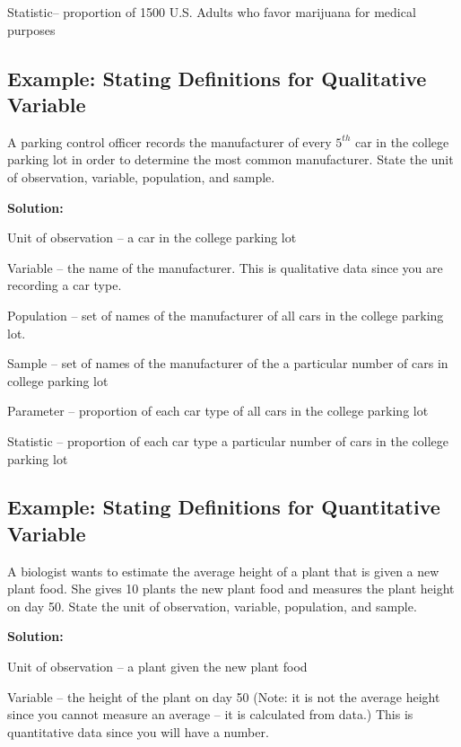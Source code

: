 \documentclass[
]{book}
\begin{document}
Statistic-- proportion of 1500 U.S. Adults who favor marijuana for medical purposes

\hypertarget{example-stating-definitions-for-qualitative-variable-1}{%
\subsection{Example: Stating Definitions for Qualitative Variable}\label{example-stating-definitions-for-qualitative-variable-1}}

A parking control officer records the manufacturer of every \(5^{th}\) car in the college parking lot in order to determine the most common manufacturer. State the unit of observation, variable, population, and sample.

\textbf{Solution:}

Unit of observation -- a car in the college parking lot

Variable -- the name of the manufacturer. This is qualitative data since you are recording a car type.

Population -- set of names of the manufacturer of all cars in the college parking lot.

Sample -- set of names of the manufacturer of the a particular number of cars in college parking lot

Parameter -- proportion of each car type of all cars in the college parking lot

Statistic -- proportion of each car type a particular number of cars in the college parking lot

\hypertarget{example-stating-definitions-for-quantitative-variable}{%
\subsection{Example: Stating Definitions for Quantitative Variable}\label{example-stating-definitions-for-quantitative-variable}}

A biologist wants to estimate the average height of a plant that is given a new plant food. She gives 10 plants the new plant food and measures the plant height on day 50. State the unit of observation, variable, population, and sample.

\textbf{Solution:}

Unit of observation -- a plant given the new plant food

Variable -- the height of the plant on day 50 (Note: it is not the average height since you cannot measure an average -- it is calculated from data.) This is quantitative data since you will have a number.
\end{document}
